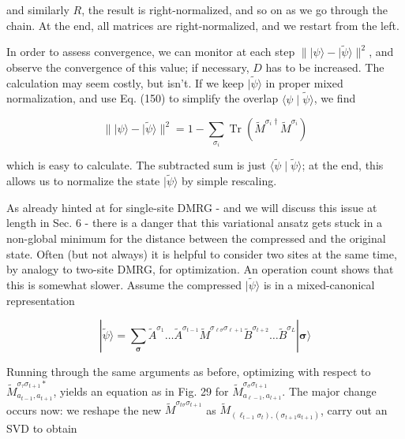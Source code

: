 \documentclass[12pt]{article}
\begin{document}
and similarly $R$, the result is right-normalized, and so on as we go through the chain. At the end, all matrices are right-normalized, and we restart from the left.

In order to assess convergence, we can monitor at each step $\||\psi\rangle-|\tilde{\psi}\rangle \|^{2}$, and observe the convergence of this value; if necessary, $D$ has to be increased. The calculation may seem costly, but isn't. If we keep $|\tilde{\psi}\rangle$ in proper mixed normalization, and use Eq. (150) to simplify the overlap $\langle\psi \mid \tilde{\psi}\rangle$, we find


\begin{equation*}
\||\psi\rangle-|\tilde{\psi}\rangle \|^{2}=1-\sum_{\sigma_{i}} \operatorname{Tr}\left(\tilde{M}^{\sigma_{i} \dagger} \tilde{M}^{\sigma_{i}}\right) \tag{152}
\end{equation*}


which is easy to calculate. The subtracted sum is just $\langle\tilde{\psi} \mid \tilde{\psi}\rangle$; at the end, this allows us to normalize the state $|\tilde{\psi}\rangle$ by simple rescaling.

As already hinted at for single-site DMRG - and we will discuss this issue at length in Sec. 6 - there is a danger that this variational ansatz gets stuck in a non-global minimum for the distance between the compressed and the original state. Often (but not always) it is helpful to consider two sites at the same time, by analogy to two-site DMRG, for optimization. An operation count shows that this is somewhat slower. Assume the compressed $|\tilde{\psi}\rangle$ is in a mixed-canonical representation


\begin{equation*}
|\tilde{\psi}\rangle=\sum_{\boldsymbol{\sigma}} \tilde{A}^{\sigma_{1}} \ldots \tilde{A}^{\sigma_{t-1}} \tilde{M}^{\sigma_{\ell \sigma} \sigma_{\ell+1}} \tilde{B}^{\sigma_{t+2}} \ldots \tilde{B}^{\sigma_{L}}|\boldsymbol{\sigma}\rangle \tag{153}
\end{equation*}


Running through the same arguments as before, optimizing with respect to $\tilde{M}_{a_{t-1}, a_{t+1}}^{\sigma_{\tau} \sigma_{t+1} *}$, yields an equation as in Fig. 29 for $\tilde{M}_{a_{\ell-1}, a_{l+1}}^{\sigma_{\sigma} \sigma_{t+1}}$. The major change occurs now: we reshape the new $\tilde{M}^{\sigma_{t \sigma} \sigma_{t+1}}$ as $\tilde{M}_{\left(\ell_{t-1} \sigma_{t}\right),\left(\sigma_{t+1} a_{t+1}\right)}$, carry out an SVD to obtain
\end{document}
